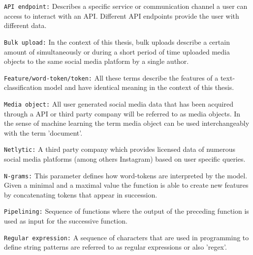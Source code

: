 \texttt{API endpoint:} Describes a specific service or communication channel a user can access to interact with an API. Different API endpoints provide the user with different data.
\newline

\texttt{Bulk upload:} In the context of this thesis, bulk uploads describe a certain amount of simultaneously or during a short period of time uploaded media objects to the same social media platform by a single author.
\newline

\texttt{Feature/word-token/token:} All these terms describe the features of a text-classification model and have identical meaning in the context of this thesis.
\newline

\texttt{Media object:} All user generated social media data that has been acquired through a API or third party company will be referred to as media objects. In the sense of machine learning the term media object can be used interchangeably with the term 'document'.
\newline

\texttt{Netlytic:} A third party company which provides licensed data of numerous social media platforms (among others Instagram) based on user specific queries.
\newline

\texttt{N-grams:} This parameter defines how word-tokens are interpreted by the model. Given a minimal and a maximal value the function is able to create new features by concatenating tokens that appear in succession.

\texttt{Pipelining:} Sequence of functions where the output of the preceding function is used as input for the successive function.

\texttt{Regular expression:} A sequence of characters that are used in programming to define string patterns are referred to as regular expressions or also 'regex'.

\cleardoublepage

